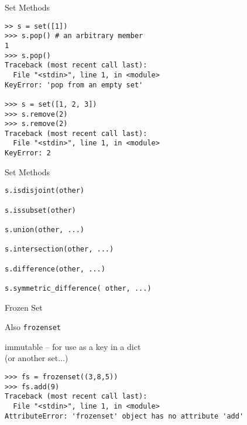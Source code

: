 \documentclass{beamer}
\begin{document}
\begin{frame}[fragile]{ Set Methods}

\begin{verbatim}
>> s = set([1])
>>> s.pop() # an arbitrary member
1
>>> s.pop()
Traceback (most recent call last):
  File "<stdin>", line 1, in <module>
KeyError: 'pop from an empty set'

>>> s = set([1, 2, 3])
>>> s.remove(2)
>>> s.remove(2)
Traceback (most recent call last):
  File "<stdin>", line 1, in <module>
KeyError: 2
\end{verbatim}

\vfill
\end{frame} 

\begin{frame}[fragile]{ Set Methods}

\begin{verbatim}
s.isdisjoint(other)

s.issubset(other)

s.union(other, ...)

s.intersection(other, ...)

s.difference(other, ...)

s.symmetric_difference( other, ...)
\end{verbatim}

\vfill
\end{frame} 

\begin{frame}[fragile]{ Frozen Set}

\vfill
{\Large Also \verb|frozenset|}

\vfill
{\Large immutable -- for use as a key in a dict\\
(or another set...)}

\vfill
\begin{verbatim}
>>> fs = frozenset((3,8,5))
>>> fs.add(9)
Traceback (most recent call last):
  File "<stdin>", line 1, in <module>
AttributeError: 'frozenset' object has no attribute 'add'
\end{verbatim}

\vfill
\end{frame} 
\end{document}
